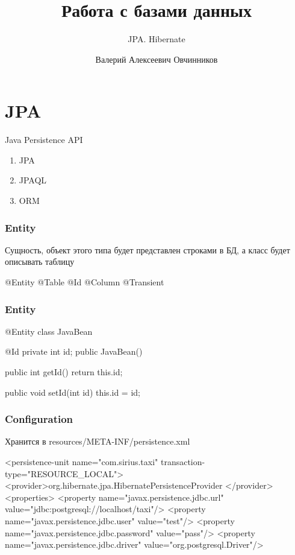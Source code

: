 \documentclass[russian,aspectratio=169,14pt]{beamer}
\title{Работа с базами данных}
\subtitle{JPA. Hibernate}
\author{Валерий Алексеевич Овчинников}
\institute{valery.ovchinnikov@phystech.edu}
\begin{document}
\maketitle

\section{JPA}

\begin{frame}
	Java Persistence API
	\vfill
	\begin{enumerate}
		\item JPA
		\item JPAQL
		\item ORM
	\end{enumerate}
\end{frame}

\begin{frame}[fragile]
	\frametitle{Entity}
	Сущность, объект этого типа будет представлен строками в БД, 
	а класс будет описывать таблицу
	\begin{listjava}
@Entity
@Table
@Id
@Column
@Transient
	\end{listjava}
\end{frame}

\begin{frame}[fragile]
	\frametitle{Entity}
	\begin{listjava}
@Entity
class JavaBean {
    @Id
    private int id;
    public JavaBean() {}

    public int getId() {
        return this.id;
    }

    public void setId(int id) {
        this.id = id;
    }
}
	\end{listjava}
\end{frame}

\begin{frame}[fragile]
	\frametitle{Configuration}
	Хранится в resources/META-INF/persistence.xml
	\vfill
	\begin{listplain}
 <persistence-unit name="com.sirius.taxi" 
                transaction-type="RESOURCE_LOCAL">
        <provider>org.hibernate.jpa.HibernatePersistenceProvider
        </provider>
        <properties>
            <property name="javax.persistence.jdbc.url" 
                 value="jdbc:postgresql://localhost/taxi"/>
            <property name="javax.persistence.jdbc.user" 
                 value="test"/>
            <property name="javax.persistence.jdbc.password" 
                 value="pass"/>
            <property name="javax.persistence.jdbc.driver" 
                 value="org.postgresql.Driver"/>
	\end{listplain}
\end{frame}
\end{document}
